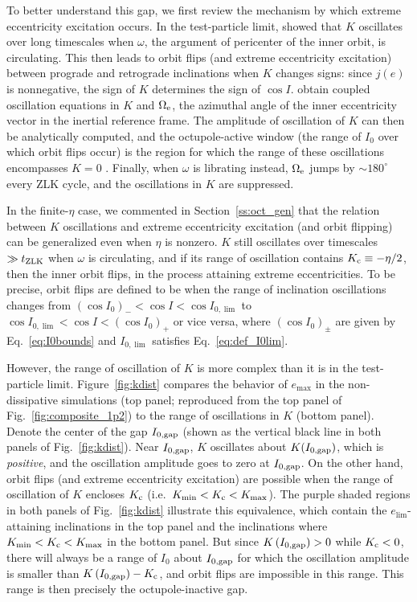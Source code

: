 \documentclass[
        fleqn,
        usenatbib,
    ]{mnras}
\newcommand*{\p}[1]{\left(#1\right)}
\begin{document}
To better understand this gap, we first review the mechanism by which extreme
eccentricity excitation occurs. In the test-particle limit, \citet{katz2011long}
showed that $K$ oscillates over long timescales when $\omega$, the argument of
pericenter of the inner orbit, is circulating. This then leads to orbit flips
(and extreme eccentricity excitation) between prograde and retrograde
inclinations when $K$ changes signs: since $j(e)$ is nonnegative, the sign of
$K$ determines the sign of $\cos I$. \citet{katz2011long} obtain coupled
oscillation equations in $K$ and $\Omega_{\rm e}$, the azimuthal angle of the
inner eccentricity vector in the inertial reference frame. The amplitude of
oscillation of $K$ can then be analytically computed, and the octupole-active
window (the range of $I_0$ over which orbit flips occur) is the region for which
the range of these oscillations encompasses $K = 0$ \citep{katz2011long}.
Finally, when $\omega$ is librating instead, $\Omega_{\rm e}$ jumps by $\sim
180^\circ$ every ZLK cycle, and the oscillations in $K$ are suppressed.

In the finite-$\eta$ case, we commented in Section~\ref{ss:oct_gen} that the
relation between $K$ oscillations and extreme eccentricity excitation (and
orbit flipping) can be generalized even when $\eta$ is nonzero. $K$ still
oscillates over timescales $\gg t_{\rm ZLK}$ when $\omega$ is circulating, and
if its range of oscillation contains $K_{\rm c} \equiv -\eta / 2$, then the
inner orbit flips, in the process attaining extreme eccentricities. To be
precise, orbit flips are defined to be when the range of inclination
oscillations changes from $\p{\cos I_0}_- < \cos I < \cos I_{0, \lim}$ to $\cos
I_{0, \lim} < \cos I < \p{\cos I_0}_+$ or vice versa, where $\p{\cos I_0}_{\pm}$
are given by Eq.~\eqref{eq:I0bounds} and $I_{0, \lim}$ satisfies
Eq.~\eqref{eq:def_I0lim}.

However, the range of oscillation of $K$ is more complex than it is in the
test-particle limit. Figure~\ref{fig:kdist} compares the behavior of $e_{\max}$
in the non-dissipative simulations (top panel; reproduced from the top panel of
Fig.~\ref{fig:composite_1p2}) to the range of oscillations in $K$ (bottom
panel). Denote the center of the gap $I_{\rm 0, gap}$ (shown as the vertical
black line in both panels of Fig.~\ref{fig:kdist}). Near $I_{\rm 0, gap}$, $K$
oscillates about $K(I_{\rm 0, gap})$, which is \emph{positive}, and the
oscillation amplitude goes to zero at $I_{\rm 0, gap}$. On the other hand, orbit
flips (and extreme eccentricity excitation) are possible when the range of
oscillation of $K$ encloses $K_{\rm c}$ (i.e.\ $K_{\min} < K_{\rm c} <
K_{\max}$). The purple shaded regions in both panels of Fig.~\ref{fig:kdist}
illustrate this equivalence, which contain the $e_{\lim}$-attaining inclinations
in the top panel and the inclinations where $K_{\min} < K_{\rm c} < K_{\max}$ in
the bottom panel. But since $K\p{I_{\rm 0, gap}} > 0$ while $K_{\rm c} < 0$,
there will always be a range of $I_0$ about $I_{\rm 0, gap}$ for which the
oscillation amplitude is smaller than $K\p{I_{\rm 0, gap}} - K_{\rm c}$, and
orbit flips are impossible in this range. This range is then precisely the
octupole-inactive gap.
\end{document}
